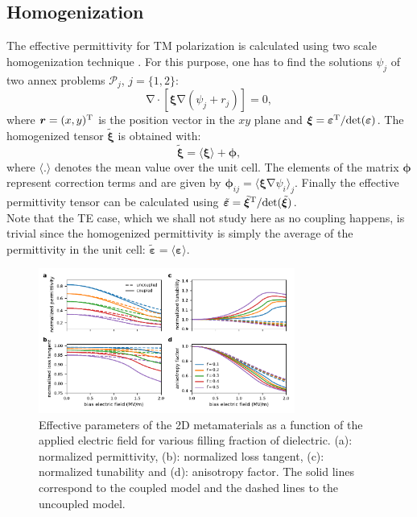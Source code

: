 \documentclass[%
 aip,
 amsmath,amssymb,
 reprint,%
linenumbers
]{revtex4-1}
\newcommand{\B}{\boldsymbol}
\newcommand{\tens}[1]{\B{#1}}
\newcommand{\grad}{\B{\mathrm{\nabla}}}
\renewcommand{\div}{\B{\mathrm{\nabla\cdotp}}}
\newcommand{\epstens}{\tens{\varepsilon}}
\newcommand{\epshom}{\tilde{\epstens}}
\newcommand{\xitens}{\tens{\xi}}
\newcommand{\xihom}{\tilde{\xitens}}
\begin{document}
\subsection{Homogenization}
The effective permittivity for TM polarization is calculated
using two scale homogenization technique \cite{allaire_homogenization_1992, guenneau_homogenization_2000}.
For this purpose, one has to find the solutions
$\psi_j$ of two annex problems $\mathcal P_j$, $j=\{1, 2\}$:
\begin{equation}
 \div \left[ \xitens \grad(\psi_j + r_j) \right] = 0,
 \label{eq_hom_annex}
\end{equation}
where $\B r = (x, y)^{\rm T}$ is the position vector in the $xy$ plane and
$\xitens=\epstens^{\rm T}/ {\rm det }(\epstens)$.
The homogenized tensor $\xihom$ is obtained with:
\begin{equation}
 \xihom = \langle \xitens \rangle + \B \phi,
 \label{eq_hom}
\end{equation}
where $\langle . \rangle$ denotes the mean value over the unit cell.
The elements of the matrix $\B \phi$ represent correction terms and
are given by $\B \phi_{ij} = \langle \xitens \grad \psi_i \rangle_j$.
Finally the effective permittivity tensor can be calculated using $\epshom=\xihom^{\rm T}/ {\rm det }(\xihom)$.\\
Note that the TE case, which we shall not study here as no coupling happens, is trivial since
the homogenized permittivity is simply the average of the permittivity in the unit cell:
$\epshom = \langle \epstens \rangle$.







\begin{figure}[!t]
 \centering
 \includegraphics[width=0.75\textwidth]{effective_params_per}
 \caption{Effective parameters of the 2D metamaterials as a function of the
  applied electric field for various filling fraction of dielectric.
  (a): normalized permittivity, (b): normalized loss tangent, (c): normalized tunability and
  (d): anisotropy factor. The solid lines correspond to the coupled model and
  the dashed lines to the uncoupled model.}
 \label{eff_par_2D_TM}
\end{figure}
\end{document}
